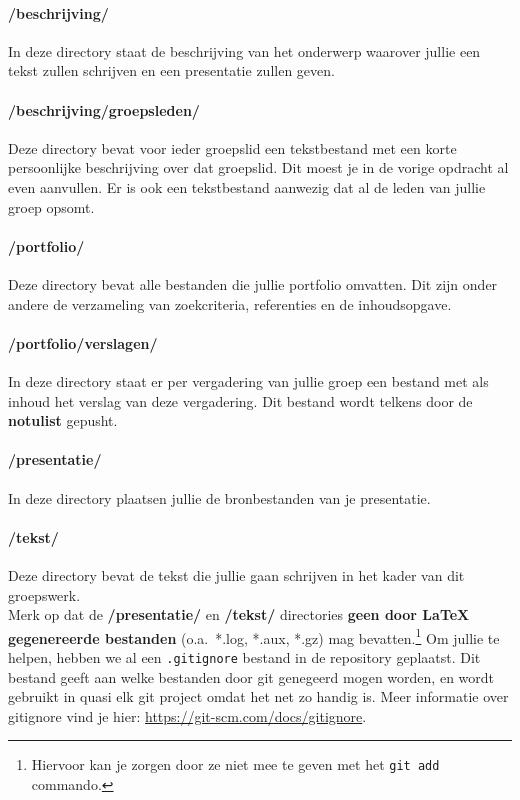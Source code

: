 \documentclass[a4paper]{article}
\begin{document}
\paragraph{/beschrijving/}
In deze directory staat de beschrijving van het onderwerp waarover jullie een tekst zullen schrijven en een presentatie zullen geven.
\paragraph{/beschrijving/groepsleden/}
Deze directory bevat voor ieder groepslid een tekstbestand met een korte persoonlijke beschrijving over dat groepslid.
Dit moest je in de vorige opdracht al even aanvullen.
Er is ook een tekstbestand aanwezig dat al de leden van jullie groep opsomt.
\paragraph{/portfolio/}
Deze directory bevat alle bestanden die jullie portfolio omvatten.
Dit zijn onder andere de verzameling van zoekcriteria, referenties en de inhoudsopgave.
\paragraph{/portfolio/verslagen/}
In deze directory staat er per vergadering van jullie groep een bestand met als inhoud het verslag van deze vergadering.
Dit bestand wordt telkens door de \textbf{notulist} gepusht.
\paragraph{/presentatie/}
In deze directory plaatsen jullie de bronbestanden van je presentatie.
\paragraph{/tekst/}
Deze directory bevat de tekst die jullie gaan schrijven in het kader van dit groepswerk.\\

Merk op dat de \textbf{/presentatie/} en \textbf{/tekst/} directories \textbf{geen door \LaTeX{} gegenereerde bestanden} (o.a.\ *.log, *.aux, *.gz) mag bevatten.\footnote{Hiervoor kan je zorgen door ze niet mee te geven met het \texttt{git add} commando.}
Om jullie te helpen, hebben we al een \texttt{.gitignore} bestand in de repository geplaatst.
Dit bestand geeft aan welke bestanden door git genegeerd mogen worden, en wordt gebruikt in quasi elk git project omdat het net zo handig is.
Meer informatie over gitignore vind je hier: \url{https://git-scm.com/docs/gitignore}.
\end{document}

